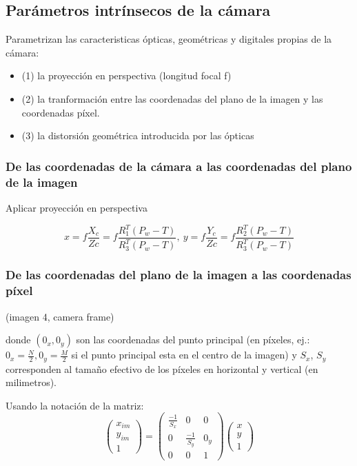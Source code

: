 \subsection{Parámetros intrínsecos de la cámara}

Parametrizan las caracteristicas ópticas, geométricas y digitales propias de la cámara:
\begin{itemize}
   \item (1) la proyección en perspectiva (longitud focal {f})
   \item (2) la tranformación entre las coordenadas del plano de la imagen y las coordenadas píxel.
   \item (3) la distorsión geométrica introducida por las ópticas
\end{itemize}

\subsubsection{De las coordenadas de la cámara a las coordenadas del plano de la imagen}

Aplicar proyección en perspectiva

\begin{equation}
x={f}\frac{X_c}{Zc}={f}\frac{R^T_1\left(P_w-T\right)}{R^T_3\left(P_w-T\right)},\
y={f}\frac{Y_c}{Zc}={f}\frac{R^T_2\left(P_w-T\right)}{R^T_3\left(P_w-T\right)}
\end{equation}
\subsubsection{De las coordenadas del plano de la imagen a las coordenadas píxel}

(imagen 4, camera frame)



donde $({0_x}, {0_y})$ son las coordenadas del punto principal (en píxeles, ej.: $0_{x}={\frac{N}{2}}, 0_{y}={\frac{M}{2}}$ si el punto principal esta en el centro de la imagen) y $S_x$, $S_y$ corresponden al tamaño efectivo de los píxeles en horizontal y vertical (en milimetros).

Usando la notación de la matriz:
\begin{equation}
  \begin{pmatrix}x_{im}\\y_{im}\\1\end{pmatrix}=\begin{pmatrix}{\frac{-1}{S_x}} & 0 & 0\\0 & {\frac{-1}{S_y}} & 0_{y}\\0 & 0 & 1\end{pmatrix}\begin{pmatrix}x\\y\\1\end{pmatrix}
\end{equation}
